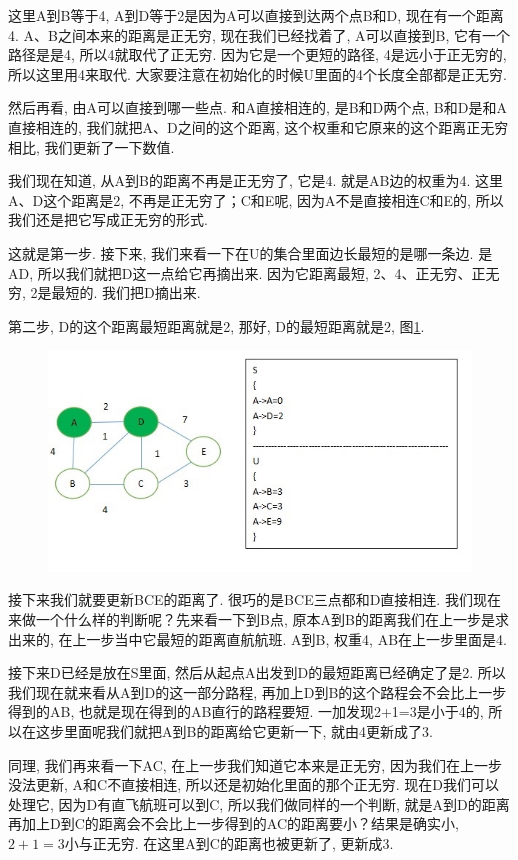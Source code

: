 这里A到B等于4, A到D等于2是因为A可以直接到达两个点B和D, 现在有一个距离4. A、B之间本来的距离是正无穷, 现在我们已经找着了, A可以直接到B, 它有一个路径是是4, 所以4就取代了正无穷. 因为它是一个更短的路径, 4是远小于正无穷的, 所以这里用4来取代. 大家要注意在初始化的时候U里面的4个长度全部都是正无穷. 

然后再看, 由A可以直接到哪一些点. 和A直接相连的, 是B和D两个点, B和D是和A直接相连的, 我们就把A、D之间的这个距离, 这个权重和它原来的这个距离正无穷相比, 我们更新了一下数值. 

我们现在知道, 从A到B的距离不再是正无穷了, 它是4. 就是AB边的权重为4. 这里A、D这个距离是2, 不再是正无穷了；C和E呢, 因为A不是直接相连C和E的, 所以我们还是把它写成正无穷的形式. 

这就是第一步. 接下来, 我们来看一下在U的集合里面边长最短的是哪一条边. 是AD, 所以我们就把D这一点给它再摘出来. 因为它距离最短, 2、4、正无穷、正无穷, 2是最短的. 我们把D摘出来. 

第二步, D的这个距离最短距离就是2, 那好, D的最短距离就是2, 图\ref{fig:img26_4}. 

\begin{figure}[ht]
  \centering
  \includegraphics[width=0.7\linewidth]{asset/20230924051223.jpg}
  \caption{}
  \label{fig:img26_4}
\end{figure}

接下来我们就要更新BCE的距离了. 很巧的是BCE三点都和D直接相连. 我们现在来做一个什么样的判断呢？先来看一下到B点, 原本A到B的距离我们在上一步是求出来的, 在上一步当中它最短的距离直航航班. A到B, 权重4, AB在上一步里面是4. 

接下来D已经是放在S里面, 然后从起点A出发到D的最短距离已经确定了是2. 所以我们现在就来看从A到D的这一部分路程, 再加上D到B的这个路程会不会比上一步得到的AB, 也就是现在得到的AB直行的路程要短. 一加发现2+1=3是小于4的, 所以在这步里面呢我们就把A到B的距离给它更新一下, 就由4更新成了3. 

同理, 我们再来看一下AC, 在上一步我们知道它本来是正无穷, 因为我们在上一步没法更新, A和C不直接相连, 所以还是初始化里面的那个正无穷. 现在D我们可以处理它, 因为D有直飞航班可以到C, 所以我们做同样的一个判断, 就是A到D的距离再加上D到C的距离会不会比上一步得到的AC的距离要小？结果是确实小,$ 2+1=3$小与正无穷. 在这里A到C的距离也被更新了, 更新成3. 

